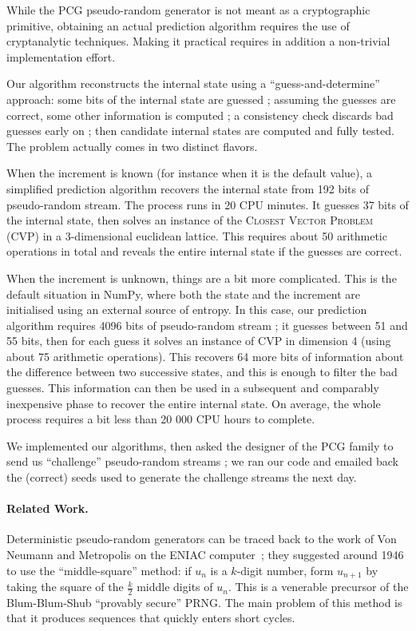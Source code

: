 \documentclass[submission,svgnames,journal=tosc]{iacrtrans}
\begin{document}
While the \textsf{PCG} pseudo-random generator is not meant as a cryptographic
primitive, obtaining an actual prediction algorithm requires the use of
cryptanalytic techniques. Making it practical requires in addition a non-trivial
implementation effort.

Our algorithm reconstructs the internal state using a ``guess-and-determine''
approach: some bits of the internal state are guessed ; assuming the guesses are
correct, some other information is computed ; a consistency check discards bad
guesses early on ; then candidate internal states are computed and fully
tested. The problem actually comes in two distinct flavors.

When the increment is known (for instance when it is the default value), a
simplified prediction algorithm recovers the internal state from 192 bits of
pseudo-random stream. The process runs in 20 CPU minutes. It guesses 37 bits of
the internal state, then solves an instance of the \textsc{Closest Vector
  Problem} (CVP) in a 3-dimensional euclidean lattice. This requires about 50
arithmetic operations in total and reveals the entire internal state if the
guesses are correct.

When the increment is unknown, things are a bit more complicated. This is the
default situation in \textsf{NumPy}, where both the state and the increment are
initialised using an external source of entropy. In this case, our prediction
algorithm requires 4096 bits of pseudo-random stream ; it guesses between 51 and
55 bits, then for each guess it solves an instance of CVP in dimension 4 (using
about 75 arithmetic operations). This recovers 64 more bits of information about
the difference between two successive states, and this is enough to filter the
bad guesses. This information can then be used in a subsequent and comparably
inexpensive phase to recover the entire internal state. On average, the whole
process requires a bit less than 20 000 CPU hours to complete.

We implemented our algorithms, then asked the designer of the \textsf{PCG}
family to send us ``challenge'' pseudo-random streams ; we ran our code and
emailed back the (correct) seeds used to generate the challenge streams the next
day.

\paragraph{Related Work.} Deterministic pseudo-random generators can be traced
back to the work of Von Neumann and Metropolis on the ENIAC
computer~\cite{vonNeumann1951}; they suggested around 1946 to use the
``middle-square'' method: if $u_n$ is a $k$-digit number, form $u_{n+1}$ by
taking the square of the $\frac{k}{2}$ middle digits of $u_n$. This is a
venerable precursor of the Blum-Blum-Shub ``provably secure'' PRNG. The main
problem of this method is that it produces sequences that quickly enters short
cycles.
\end{document}
